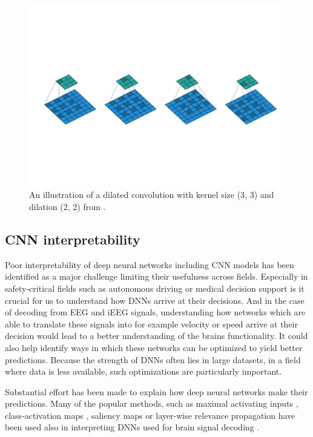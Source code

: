 \begin{figure}[!htpb]
\centering
   \includegraphics[width=0.8\linewidth]{img/ch3/dilated-conv}
   \caption[Dilated convolution]{An illustration of a dilated convolution with kernel size (3, 3) and dilation (2, 2) from \cite{dilated-conv}.}
   \label{fig:dilation}
\end{figure}


\subsection{CNN interpretability}\label{subsec:cnn-interpretability}
Poor interpretability of deep neural networks including CNN models has been identified as a major challenge limiting their usefulness across fields. 
Especially in safety-critical fields such as autonomous driving or medical decision support is it crucial for us to understand how DNNs arrive at their decisions.
And in the case of decoding from EEG and iEEG signals, understanding how networks which are able to translate these signals into for example velocity or speed arrive at their decision would lead to a better understanding of the brains functionality. 
It could also help identify ways in which these networks can be optimized to yield better predictions.
Because the strength of DNNs often lies in large datasets, in a field where data is less available, such optimizations are particularly important.

Substantial effort has been made to explain how deep neural networks make their predictions.
Many of the popular methods, such as maximal activating inputs \cite{maximizing-activation}, class-activation maps \cite{class-activation-maps}, saliency maps \cite{gradient-visualization} or layer-wise relevance propagation \cite{sturm-interpretable-2016} have been used also in interpreting DNNs used for brain signal decoding \cite{goodfellow-towards-2018, hartmann-hierarchical-2018, rieke-visualizing-2018, yang-visual-2018,  sturm-interpretable-2016, }.

